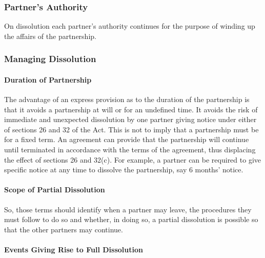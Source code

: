 \documentclass[
]{article}
\begin{document}
\hypertarget{partners-authority}{%
\subsubsection{Partner's Authority}\label{partners-authority}}

On dissolution each partner's authority continues for the purpose of
winding up the affairs of the partnership.

\hypertarget{managing-dissolution}{%
\subsubsection{Managing Dissolution}\label{managing-dissolution}}

\hypertarget{duration-of-partnership}{%
\paragraph{Duration of Partnership}\label{duration-of-partnership}}

The advantage of an express provision as to the duration of the
partnership is that it avoids a partnership at will or for an undefined
time. It avoids the risk of immediate and unexpected dissolution by one
partner giving notice under either of sections 26 and 32 of the Act.
This is not to imply that a partnership must be for a fixed term. An
agreement can provide that the partnership will continue until
terminated in accordance with the terms of the agreement, thus
displacing the effect of sections 26 and 32(c). For example, a partner
can be required to give specific notice at any time to dissolve the
partnership, say 6 months' notice.

\hypertarget{scope-of-partial-dissolution}{%
\paragraph{Scope of Partial
Dissolution}\label{scope-of-partial-dissolution}}

So, those terms should identify when a partner may leave, the procedures
they must follow to do so and whether, in doing so, a partial
dissolution is possible so that the other partners may continue.

\hypertarget{events-giving-rise-to-full-dissolution}{%
\paragraph{Events Giving Rise to Full
Dissolution}\label{events-giving-rise-to-full-dissolution}}
\end{document}
